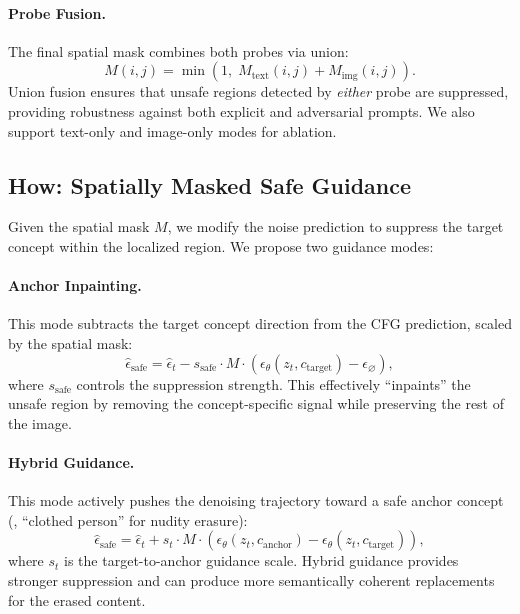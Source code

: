 \paragraph{Probe Fusion.} The final spatial mask combines both probes via union:
\begin{equation}
    M(i,j) = \min\left(1, \; M_\text{text}(i,j) + M_\text{img}(i,j)\right).
    \label{eq:fusion}
\end{equation}
Union fusion ensures that unsafe regions detected by \emph{either} probe are suppressed, providing robustness against both explicit and adversarial prompts. We also support text-only and image-only modes for ablation.

\subsection{How: Spatially Masked Safe Guidance}
\label{subsec:how}

Given the spatial mask $M$, we modify the noise prediction to suppress the target concept within the localized region. We propose two guidance modes:

\paragraph{Anchor Inpainting.} This mode subtracts the target concept direction from the CFG prediction, scaled by the spatial mask:
\begin{equation}
    \hat{\epsilon}_\text{safe} = \hat{\epsilon}_t - s_\text{safe} \cdot M \cdot (\epsilon_\theta(z_t, c_\text{target}) - \epsilon_\varnothing),
    \label{eq:anchor_inpaint}
\end{equation}
where $s_\text{safe}$ controls the suppression strength. This effectively ``inpaints'' the unsafe region by removing the concept-specific signal while preserving the rest of the image.

\paragraph{Hybrid Guidance.} This mode actively pushes the denoising trajectory toward a safe anchor concept (\eg, ``clothed person'' for nudity erasure):
\begin{equation}
    \hat{\epsilon}_\text{safe} = \hat{\epsilon}_t + s_t \cdot M \cdot (\epsilon_\theta(z_t, c_\text{anchor}) - \epsilon_\theta(z_t, c_\text{target})),
    \label{eq:hybrid}
\end{equation}
where $s_t$ is the target-to-anchor guidance scale. Hybrid guidance provides stronger suppression and can produce more semantically coherent replacements for the erased content.

